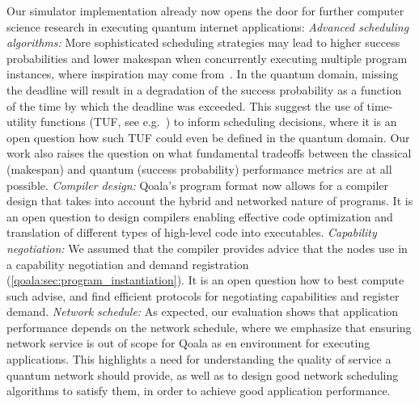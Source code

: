 Our simulator implementation already now opens the door for further computer science research in executing quantum internet applications:
\textit{Advanced scheduling algorithms:}
More sophisticated scheduling strategies may lead to higher success probabilities and lower makespan when concurrently executing multiple program instances, where inspiration may come from~\cite{topcuoglu2002performance, baruah2011scheduling, andersson2006multiprocessor, polychronopoulos1991hierarchical}. 
In the quantum domain, missing the deadline will result in a degradation of the success probability as a function of the time by which the deadline was exceeded.
This suggest the use of time-utility functions (TUF, see e.g.~\cite{jensen1993timeliness, li2004utility}) to inform scheduling decisions, where it is an open question how such TUF could even be defined in the quantum domain.
Our work also raises the question on what fundamental tradeoffs between the classical (makespan) and quantum (success probability) performance metrics are at all possible.
\textit{Compiler design:}
Qoala's program format now allows for a compiler design that takes into account the hybrid and networked nature of programs.
It is an open question to design compilers enabling effective code optimization and translation of different types of high-level code into executables.
\textit{Capability negotiation:}
We assumed that the compiler provides advice that the nodes use in a capability negotiation and demand registration (\cref{qoala:sec:program_instantiation}).
It is an open question how to best compute such advise, and find efficient protocols for negotiating capabilities and register demand.
\textit{Network schedule:}
As expected, our evaluation shows that application performance depends on the network schedule, where we emphasize that ensuring network service is out of scope for Qoala as en environment for executing applications.
This highlights a need for understanding the quality of service a quantum network should provide, as well as to design good network scheduling algorithms to satisfy them, in order to achieve good application performance.
